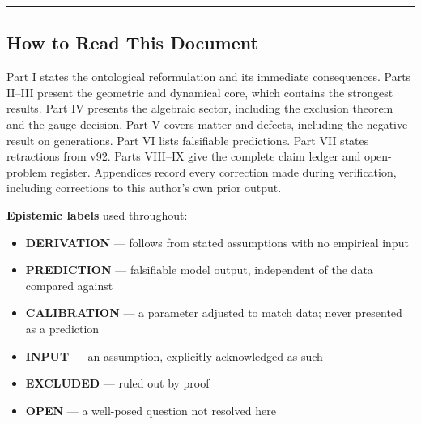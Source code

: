 \documentclass[a4paper,11pt]{article}
\begin{document}
\begin{abstract}
\textbf{What is excluded by theorem.} SO(8) cannot be the gauge algebra, by two independent proofs. The Standard Model algebra does not embed in $\mathfrak{so}(8)$ by any route. The anisotropy coefficient $\xi_2=-1/384$ is not derivable from the stated lattice. Both time-step values stated in v92 violate the framework's own stability bound. Three generations is \textbf{not} a derived result: five candidate mechanisms were tested and all five are closed. Monopole absence, claimed in earlier versions, is inconsistent with an $E_6$ gauge group.

\textbf{What remains open} is stated exhaustively in \S~IX, classified by the type of work each item requires. Every correction made during verification --- including corrections to the author's own prior output --- is recorded in the appendices, and every externally attributable claim carries a linked numerical citation.

The framework claims substantially less than v92 did. What it now claims has been checked --- by hand, by simulation, by independent reproduction, and now by machine.
\end{abstract}
\vspace{1.2cm}
\hrule
\vspace{1.4cm}
\subsection*{How to Read This Document}

Part I states the ontological reformulation and its immediate consequences. Parts II–III present the geometric and dynamical core, which contains the strongest results. Part IV presents the algebraic sector, including the exclusion theorem and the gauge decision. Part V covers matter and defects, including the negative result on generations. Part VI lists falsifiable predictions. Part VII states retractions from v92. Parts VIII–IX give the complete claim ledger and open-problem register. Appendices record every correction made during verification, including corrections to this author's own prior output.

\textbf{Epistemic labels} used throughout:

\begin{itemize}
\item \textbf{DERIVATION} — follows from stated assumptions with no empirical input
\item \textbf{PREDICTION} — falsifiable model output, independent of the data compared against
\item \textbf{CALIBRATION} — a parameter adjusted to match data; never presented as a prediction
\item \textbf{INPUT} — an assumption, explicitly acknowledged as such
\item \textbf{EXCLUDED} — ruled out by proof
\item \textbf{OPEN} — a well-posed question not resolved here
\end{itemize}
\end{document}
